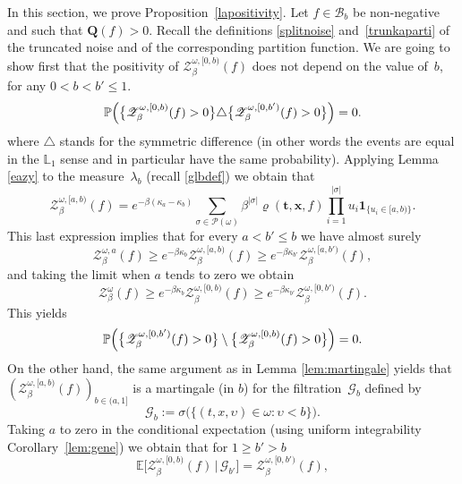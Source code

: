 \documentclass[JEP,XML,SOM,Unicode,published]{cedram}
\let\mathcal\mathscr
\let\sep:
\theoremstyle{definition}
\newcommand{\bt}{\boldsymbol{t}}
\newcommand{\bx}{\boldsymbol{x}}
\newcommand{\ind}{\mathbf{1}}
\newcommand{\cB}{{\ensuremath{\mathcal B}} }
\newcommand{\cP}{{\ensuremath{\mathcal P}} }
\newcommand{\cZ}{{\ensuremath{\mathcal Z}} }
\newcommand{\bQ}{{\ensuremath{\mathbf Q}} }
\newcommand{\bbE}{{\ensuremath{\mathbb E}} }
\newcommand{\bbL}{{\ensuremath{\mathbb L}} }
\newcommand{\bbP}{{\ensuremath{\mathbb P}} }
\let\gb\beta
\let\gl\lambda
\let\ups\upsilon
\let\go\omega
\begin{document}
In this section, we prove Proposition~\ref{lapositivity}.
Let $f\in \cB_b$ be non-negative and such that $\bQ(f)> 0$.
Recall the definitions \eqref{splitnoise} and~\eqref{trunkaparti} of the truncated noise and of the corresponding partition function. We are going to show first that the positivity of $\cZ^{\go,[0,b)}_\beta (f)$ does not depend on the value of~$b$,
for any $ 0<b< b'\le 1$.
\begin{equation}\label{ekwalzs}
\bbP\Bigl(\bigl\{ \cZ^{\go,[0,b)}_\beta (f)>0 \bigr\} \triangle \bigl\{ \cZ^{\go,[0,b')}_\beta (f) >0 \bigr\} \Bigr) =0.
\end{equation}
where $\triangle$ stands for the symmetric difference (in other words the events are equal in the $\bbL_1$ sense and in particular have the same probability).
Applying Lemma \ref{eazy} to the measure~$\gl_b$ (recall \eqref{glbdef}) we obtain that
\begin{equation}
\cZ^{\go,[a,b)}_\beta(f)= e^{-\gb (\kappa_a-\kappa_b)} \sum_{\sigma\in \cP(\go)} \beta^{|\sigma|} \varrho(\bt,\bx, f) \prod_{i=1}^{|\sigma|} u_i\ind_{\{ u_i\in[a,b) \}}.
\end{equation}
This last expression implies that for every $a<b' \leq b$ we have almost surely
\begin{equation}
\label{eq:ZaZab}
\cZ^{\go,a}_\beta (f) \ge e^{-\gb\kappa_b}\cZ^{\go,[a,b)}_\beta (f) \ge e^{-\gb\kappa_{b'}} \cZ^{\go,[a,b')}_\beta (f),
\end{equation}
and taking the limit when $a$ tends to zero we obtain
\begin{equation}
\cZ^{\go}_\beta (f) \ge e^{-\gb\kappa_b} \cZ^{\go,[0,b)}_\beta (f) \ge e^{-\gb\kappa_{b'}} \cZ^{\go,[0,b')}_\beta (f).
\end{equation}
This yields
\[
\bbP\Bigl(\bigl\{ \cZ^{\go,[0,b')}_\beta (f)>0 \bigr\} \setminus \bigl\{ \cZ^{\go,[0,b)}_\beta (f) >0 \bigr\} \Bigr) =0.
\]
On the other hand, the same argument as in Lemma \ref{lem:martingale} yields that $
(\cZ^{\go,[a,b)}_\beta (f))_{b\in(a,1]}$ is a martingale (in $b$) for the filtration~$\mathcal{G}_b$ defined by
\begin{equation}
\mathcal G_b:= \sigma \bigl(\{ (t,x,\ups)\in \go \sep \ups <b \}\bigr).
\end{equation}
Taking $a$ to zero in the conditional expectation (using uniform integrability \cf Corol\-lary~\ref{lem:gene}) we obtain that for $1\geq b'>b$
\begin{equation}
\bbE \bigl[ \cZ^{\go,[0, b)}_\beta (f) \, \big| \, \mathcal G_{ b'} \bigr]= \cZ^{\go,[0, b')}_\beta (f),
\end{equation}
\end{document}

